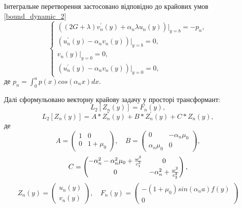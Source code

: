 Інтегральне перетворення застосовано відповідно до крайових умов \eqref{bound_dynamic_2}
\begin{equation}\label{transf_bound_dynamic_2}
    \begin{cases}
        \left( (2G + \lambda)v_n^{'}(y) + \alpha_n \lambda u_n(y) \right)|_{y=b} = -p_n, \\
        \left(u_n^{'}(y) - \alpha_n v_n(y)  \right)|_{y=b} = 0, \\
        v_n(y)|_{y=0} = 0, \\
        \left(u_n^{'}(y) - \alpha_n v_n(y)  \right)|_{y=0} = 0,
    \end{cases}
\end{equation}
де $p_n = \int_{0}^{a} p(x) cos(\alpha_n x) dx$.

Далі сформульовано векторну крайову задачу у просторі трансформант:
\begin{equation}\label{transf_mat_dynamic_2}
    L_2\left[ Z_n(y) \right] = F_n(y),
\end{equation}
\begin{equation}
    L_2\left[ Z_n(y) \right] = A * Z_n^{''}(y) + B * Z_n^{'}(y) + C * Z_n(y),
\end{equation}
де
\begin{equation*}
    A = \begin{pmatrix}
        1 & 0 \\
        0 & 1 + \mu_0
    \end{pmatrix}, \quad
    B = \begin{pmatrix}
        0 & -\alpha_n \mu_0 \\
        \alpha_n \mu_0 & 0
    \end{pmatrix},
\end{equation*}
\begin{equation*}
    \centering
    C = \begin{pmatrix}
        -\alpha_n^2 -\alpha_n^2 \mu_0 + \frac{\omega^2}{c_1^2} & 0 \\
        0 & -\alpha_n^2 + \frac{\omega^2}{c_2^2}
    \end{pmatrix},
\end{equation*}
\begin{equation*}
    Z_n(y) = \begin{pmatrix}
        u_n(y) \\
        v_n(y)
    \end{pmatrix}, \quad 
    F_n(y) = \begin{pmatrix}
        -(1 + \mu_0)sin(\alpha_n a) f(y) \\
        0
    \end{pmatrix}
\end{equation*}
